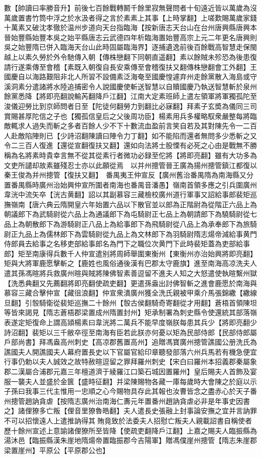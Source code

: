 數【帥讀曰率勝音升】前後七百餘戰轉鬭千餘里寂無聲問者十旬遠近皆以萬歲為沒萬歲置書竹筒中浮之於水汲者得之言於素素上其事【上時掌翻】上嗟歎賜萬歲家錢十萬素又破沈孝徹於温州步道向天台指臨海【按新唐志天台山在台州唐興縣唐興本晉始豐縣始豐本吳之始平縣唐志云武德四年析臨海置始豐高宗上元二年更名唐興則吳之始豐隋已併入臨海天台山此時固屬臨海界】逐捕遺逸前後百餘戰高智慧走保閩越上以素久勞於外令馳傳入朝【傳株戀翻下同朝直遥翻】素以餘賊未殄恐為後患復請行遂乘傳至會稽【素既入朝復自長安乘傳至會稽復扶又翻傳株戀翻會工外翻】王國慶自以海路艱阻非北人所習不設備素泛海奄至國慶惶遽弃州走餘黨散入海島或守溪洞素分遣諸將水陸追捕密令人說國慶使斬送智慧以自贖國慶乃執送智慧斬於泉州餘黨悉降【將即亮翻說輸芮翻降戶江翻】江南大定素班師上遣左領軍將軍獨孤陀至浚儀迎勞比到京師問者日至【陀徒何翻勞力到翻比必寐翻】拜素子玄奬為儀同三司賞賜甚厚陀信之子也【獨孤信皇后之父後周功臣】楊素用兵多權略馭衆嚴整每將臨敵輒求人過失而斬之多者百餘人少不下十數流血盈前言笑自若及其對陳先令一二百人赴敵陷陣則已【少詩沼翻陳讀曰陣令力丁翻】如不能陷而還者無問多少悉斬之又令二三百人復進【還從宣翻復扶又翻】還如向法將士股慄有必死之心由是戰無不勝稱為名將素時貴幸言無不從其從素行者微功必録至佗將【將即亮翻】雖有大功多為文吏所譴却故素雖殘忍士亦以此願從焉　以并州摠管晉王廣為揚州摠管鎮江都復以秦王俊為并州摠管【復扶又翻】　番禺夷王仲宣反【廣州舊治番禺隋為南海縣又分置番禺縣時廣州治始興仲宣所圍者南海也番禺音潘愚】嶺南首領多應之引兵圍廣州韋洸中流矢卒【洸古黄翻】詔以其副慕容三藏檢校廣州道行軍事又詔給事郎裴矩巡撫嶺南【唐六典云隋開皇六年始置六品以下散官並以郎為正階尉為從階正六品上為朝議郎下為武騎尉從六品上為通議郎下為屯騎尉正七品上為朝請郎下為驍騎尉從七品上為朝散郎下為游騎尉正八品上為給事郎下為飛騎尉從八品上為承奉郎下為旅騎尉正九品上為儒林郎下為雲騎尉從九品上為文林郎下為羽騎尉隋志煬帝減給事黄門侍郎員去給事之名移吏部給事郎名為門下之職位次黄門下此時裴矩蓋為吏部給事郎】矩至南康得兵數千人仲宣遣别將周師舉圍東衡州【東衡州亦治始興將即亮翻】矩與大將軍鹿愿擊斬之【鹿姓也風俗通後漢有巴郡太守鹿旗】進至南海高凉洗夫人遣其孫馮暄將兵救廣州暄與賊將陳佛智素善逗留不進夫人知之大怒遣使執暄繫州獄【洗悉典翻又先薦翻將即亮翻使疏吏翻】更遣孫盎出討佛智斬之進會鹿愿於南海與慕容三藏合擊仲宣【藏徂浪翻】仲宣衆潰廣州獲全洗氏親被甲乘介馬張錦繖【繖線旦翻】引彀騎衛從裴矩巡撫二十餘州【彀古侯翻騎奇寄翻從才用翻】蒼梧首領陳坦等皆來謁見【隋志蒼梧郡梁置成州隋置封州】矩承制署為刺史縣令使還統其部落嶺表遂定矩復命上謂高熲楊素曰韋洸將二萬兵不能早度嶺朕每患其兵少【將即亮翻少詩沼翻】裴矩以三千敝卒徑至南海有臣若此朕亦何憂以矩為民部侍郎【民部侍郎屬戶部尚書】拜馮盎高州刺史【高凉郡舊置高州】追贈馮寶廣州摠管譙國公册洗氏為譙國夫人開譙國夫人幕府置長史以下官屬官給印章聽發部落六州兵馬若有機急便宜行事仍勅以夫人誠效之故特赦暄逗留之罪拜羅州刺史【宋白曰羅州本招義郡秦屬象郡二漢屬合浦郡元嘉三年檀道濟于綾羅江口築石城因置羅州】皇后賜夫人首飾及宴服一襲夫人並盛於金篋【盛時征翻】并梁陳賜物各藏一庫每歲時大會陳之於庭以示子孫曰我事三代主惟用一忠順之心今賜物具存此其報也汝曹皆念之盡赤心於天子番州摠管趙訥貪虐【按隋志廣州治南海仁夀元年置番州趙訥貪虐必非是年事史因書之】諸俚獠多亡叛【俚音里獠魯皓翻】夫人遣長史張融上封事論安撫之宜并言訥罪不可以招懷遠人上遣推訥得其賄竟致於法委夫人招慰亡叛夫人親載詔書自稱使者歷十餘州宣述上意諭諸俚獠所至皆降【使疏吏翻降戶江翻】上嘉之賜夫人臨振縣為湯沐邑【臨振縣漢朱崖地隋煬帝置臨振郡今吉陽軍】贈馮僕崖州摠管【隋志朱崖郡梁置崖州】平原公【平原郡公也】

